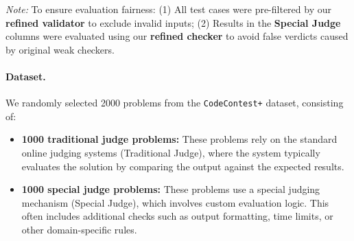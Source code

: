 \documentclass[11pt]{article}
\begin{document}
\begin{table}[t]
\centering
{}

\vspace{1mm}
\begin{minipage}{0.95\linewidth}
    \footnotesize
    \textit{Note:} To ensure evaluation fairness: 
    (1) All test cases were pre-filtered by our \textbf{refined validator} to exclude invalid inputs; 
    (2) Results in the \textbf{Special Judge} columns were evaluated using our \textbf{refined checker} to avoid false verdicts caused by original weak checkers.
\end{minipage}


\caption{Comparison of Overall Validation Pass Rate (VPR) of original datasets, and correctness metrics (TPR/TNR) across 2000 problems with among different datasets.}
\label{tab:dataset-performance}
\end{table}

\paragraph{Dataset.}
We randomly selected 2000 problems from the \texttt{CodeContest+} dataset, consisting of:
\begin{itemize}
    \item \textbf{1000 traditional judge problems:} These problems rely on the standard online judging systems (Traditional Judge), where the system typically evaluates the solution by comparing the output against the expected results.
    \item \textbf{1000 special judge problems:} These problems use a special judging mechanism (Special Judge), which involves custom evaluation logic. This often includes additional checks such as output formatting, time limits, or other domain-specific rules.
\end{itemize}
\end{document}
